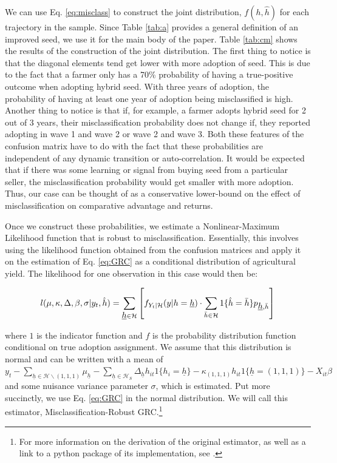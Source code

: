 \documentclass[11pt]{article}
\begin{document}
We can use Eq. \ref{eq:misclass} to construct the joint distribution, $f(h, \hat{h})$ for each trajectory in the sample. Since Table \ref{tab:a} provides a general definition of an improved seed, we use it for the main body of the paper. Table \ref{tab:cm} shows the results of the construction of the joint distribution. The first thing to notice is that the diagonal elements tend get lower with more adoption of seed. This is due to the fact that a farmer only has a 70\% probability of having a true-positive outcome when adopting hybrid seed. With three years of adoption, the probability of having at least one year of adoption being misclassified is high. Another thing to notice is that if, for example, a farmer adopts hybrid seed for 2 out of 3 years, their misclassification probability does not change if, they reported adopting in wave 1 and wave 2 or wave 2 and wave 3. Both these features of the confusion matrix have to do with the fact that these probabilities are independent of any dynamic transition or auto-correlation. It would be expected that if there was some learning or signal from buying seed from a particular seller, the misclassification probability would get smaller with more adoption. Thus, our case can be thought of as a conservative lower-bound on the effect of misclassification on comparative advantage and returns.



Once we construct these probabilities, we estimate a Nonlinear-Maximum Likelihood function that is robust to misclassification. Essentially, this involves using the likelihood function obtained from the confusion matrices and apply it on the estimation of Eq. \ref{eq:GRC} as a conditional distribution of agricultural yield. The likelihood for one observation in this case would then be:

\begin{equation}
\label{eq:mr-grc}
l(\mu, \kappa, \Delta, \beta, \sigma|y_{t}, \hat{h}) = \sum_{\underbar{$h$}\in\mathcal{H}} \left[ f_{Y_{t}| \mathcal{H}}(y|h=\underbar{$h$})\cdot  \sum_{\bar{h} \in \mathcal{H}} 1\{\hat{h}=\bar{h}\} p_{\underbar{$h$}, \bar{h}} \right]
\end{equation}

\noindent where $1$ is the indicator function and $f$ is the probability distribution function conditional on true adoption assignment. We assume that this distribution is normal and can be written with a mean of $y_t - \sum_{\underline{h}\in\mathcal{H}\backslash (1,1,1)}\mu_{\underline{h}}-\sum_{\underline{h}\in\mathcal{H}_{S}}\Delta_{\underline{h}}h_{it}1\{h_{i}=\underline{h}\} - \kappa_{(1,1,1)}h_{it}1\{\underline{h}=(1,1,1)\}- X_{it}\beta$ and some nuisance variance parameter $\sigma$, which is estimated. Put more succinctly, we use Eq. \ref{eq:GRC} in the normal distribution. We will call this estimator, Misclassification-Robust GRC.\footnote{For more information on the derivation of the original estimator, as well as a link to a python package of its implementation, see \cite{michuda2021three}.}
\end{document}
